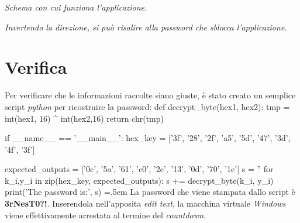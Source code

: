 \documentclass[a4paper, 12pt]{article}
\newenvironment{myverb}
 {\SaveVerbatim{cverb}}
 {\endSaveVerbatim
  \flushleft\fboxrule=0pt\fboxsep=.5em
  \colorbox{cverbbg}{%
    \makebox[\dimexpr\linewidth-2\fboxsep][l]{\BUseVerbatim{cverb}}%
  }
  \endflushleft
}
\begin{document}
\begin{minipage}{0.45\textwidth}
\textit{Schema con cui funziona l'applicazione.}
\end{minipage}\hfill
\begin{minipage}{0.45\textwidth}
\textit{Invertendo la direzione, si può risalire alla password che sblocca l'applicazione.}
\end{minipage}

\newpage
\section{Verifica}
Per verificare che le informazioni raccolte siano giuste, è stato creato un semplice script \textit{python} per ricostruire la password:
\begin{myverb}
def decrypt_byte(hex1, hex2):
    tmp = int(hex1, 16) ^ int(hex2,16)
    return chr(tmp)

if __name__ == '__main__':
    hex_key = ['3f', '28', '2f', 'a5', '5d', '47', 
            '3d', '4f', '3f']
            
    expected_outputs = ['0c', '5a', '61', 'c0', '2e',
            '13', '0d', '70', '1e']
    s = ''
    for k_i,y_i in zip(hex_key, expected_outputs):
        s += decrypt_byte(k_i, y_i)
    print('The password is:', s)
\end{myverb}
La password che viene stampata dallo script è \textbf{3rNesT0?!}. Inserendola nell'apposita \textit{edit text}, la macchina virtuale \textit{Windows} viene effettivamente arrestata al termine del \textit{countdown}.
\end{document}
